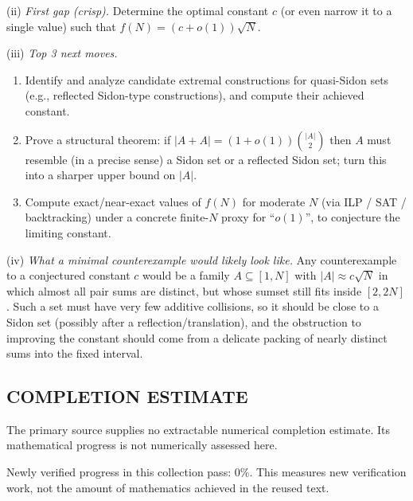 (ii) \emph{First gap (crisp).} Determine the optimal constant $c$ (or even narrow it to a single value) such that $f(N)=(c+o(1))\sqrt N$.

(iii) \emph{Top 3 next moves.}
\begin{enumerate}
\item Identify and analyze candidate extremal constructions for quasi-Sidon sets (e.g., reflected Sidon-type constructions), and compute their achieved constant.
\item Prove a structural theorem: if $|A+A|=(1+o(1))\binom{|A|}{2}$ then $A$ must resemble (in a precise sense) a Sidon set or a reflected Sidon set; turn this into a sharper upper bound on $|A|$.
\item Compute exact/near-exact values of $f(N)$ for moderate $N$ (via ILP / SAT / backtracking) under a concrete finite-$N$ proxy for ``$o(1)$'', to conjecture the limiting constant.
\end{enumerate}

(iv) \emph{What a minimal counterexample would likely look like.} Any counterexample to a conjectured constant $c$ would be a family $A\subseteq[1,N]$ with $|A|\approx c\sqrt N$ in which almost all pair sums are distinct, but whose sumset still fits inside $[2,2N]$. Such a set must have very few additive collisions, so it should be close to a Sidon set (possibly after a reflection/translation), and the obstruction to improving the constant should come from a delicate packing of nearly distinct sums into the fixed interval.



\subsection*{COMPLETION ESTIMATE}
The primary source supplies no extractable numerical completion estimate. Its mathematical progress is not numerically assessed here.

Newly verified progress in this collection pass: $0\%$. This measures new verification work, not the amount of mathematics achieved in the reused text.
